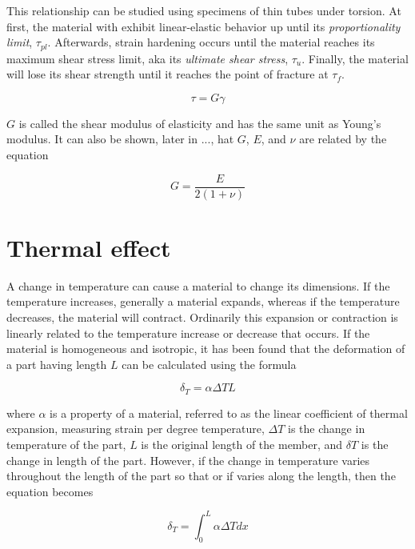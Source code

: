 \documentclass[
10pt,
a4paper,
openany,
svgnames,
]{kaobook} %
\begin{document}
This relationship can be studied using specimens of thin tubes under torsion. At first, the material with exhibit linear-elastic behavior up until its \emph{proportionality limit}, $\tau_{pl}$. Afterwards, strain hardening occurs until the material reaches its maximum shear stress limit, aka its \emph{ultimate shear stress}, $\tau_{u}$. Finally, the material will lose its shear strength until it reaches the point of fracture at $\tau_{f}$.

\begin{equation}
  \tau  = G\gamma
\end{equation}

$G$ is called the shear modulus of elasticity and has the same unit as Young’s modulus. It can also be shown, later in ..., hat $G$, $E$, and $\nu$ are related by the equation

\begin{equation}
  \label{eq: young and shear}
  G = \frac{E}{2(1 + \nu)}
\end{equation}

\section{Thermal effect}

A change in temperature can cause a material to change its dimensions. If the temperature increases, generally a material expands, whereas if the temperature decreases, the material will contract. Ordinarily this expansion or contraction is linearly related to the temperature increase or decrease that occurs. If the material is homogeneous and isotropic, it has been found that the deformation of a part having length $L$ can be calculated using the formula

\begin{equation}
  \delta _T = \alpha \Delta TL
\end{equation}

where $\alpha$ is a property of a material, referred to as the linear coefficient of thermal expansion, measuring strain per degree temperature, $\Delta T$ is the change in temperature of the part, $L$ is the original length of the member, and $\delta T$ is the change in length of the part. However, if the change in temperature varies throughout the length of the part so that or if varies along the length, then the equation becomes

\begin{equation}
  \delta _T = \int_0^L \alpha \Delta Tdx
\end{equation}
\end{document}

